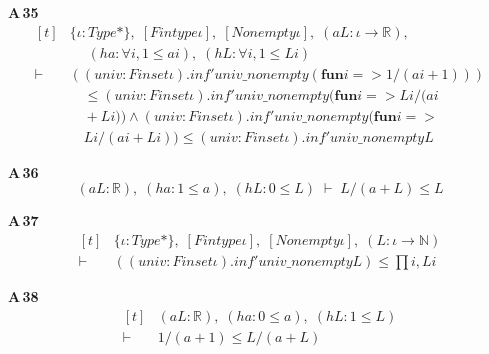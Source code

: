 \noindent\textbf{A\,35}\quad{}
{\footnotesize\[ \begin{aligned}[t]
&\{ \iota : \mathit{Type}*\},\; [\mathit{Fintype} \iota ],\; [\mathit{Nonempty} \iota ],\; (\mathit{a} \mathit{L} : \iota \to \mathbb{R} ),\\
&\quad \; (\mathit{ha} : \forall \mathit{i}, 1 \leq \mathit{a} \mathit{i}),\; (\mathit{hL} : \forall \mathit{i}, 1 \leq \mathit{L} \mathit{i})\\
\vdash\;&((\mathit{univ} : \mathit{Finset} \iota ).\mathit{inf'} \mathit{univ\_nonempty} (\mathbf{fun} \mathit{i} => 1/(\mathit{a} \mathit{i} + 1)))\\
&\quad \leq (\mathit{univ} : \mathit{Finset} \iota ).\mathit{inf'} \mathit{univ\_nonempty} (\mathbf{fun} \mathit{i} => \mathit{L} \mathit{i}/(\mathit{a} \mathit{i}\\
&\quad + \mathit{L} \mathit{i})) \wedge (\mathit{univ} : \mathit{Finset} \iota ).\mathit{inf'} \mathit{univ\_nonempty} (\mathbf{fun} \mathit{i} =>\\
&\quad \mathit{L} \mathit{i}/(\mathit{a} \mathit{i} + \mathit{L} \mathit{i})) \leq (\mathit{univ} : \mathit{Finset} \iota ).\mathit{inf'} \mathit{univ\_nonempty} \mathit{L}
\end{aligned} \]}

\noindent\textbf{A\,36}\quad{}
{\footnotesize\[ (\mathit{a} \mathit{L} : \mathbb{R} ),\; (\mathit{ha} : 1 \leq \mathit{a}),\; (\mathit{hL} : 0 \leq \mathit{L}) \;\vdash\; \mathit{L}/(\mathit{a} + \mathit{L}) \leq \mathit{L} \]}

\noindent\textbf{A\,37}\quad{}
{\footnotesize\[ \begin{aligned}[t]
&\{ \iota : \mathit{Type}*\},\; [\mathit{Fintype} \iota ],\; [\mathit{Nonempty} \iota ],\; (\mathit{L} : \iota \to \mathbb{N} )\\
\vdash\;&((\mathit{univ} : \mathit{Finset} \iota ).\mathit{inf'} \mathit{univ\_nonempty} \mathit{L}) \leq \textstyle\prod \mathit{i}, \mathit{L} \mathit{i}
\end{aligned} \]}

\noindent\textbf{A\,38}\quad{}
{\footnotesize\[ \begin{aligned}[t]
&(\mathit{a} \mathit{L} : \mathbb{R} ),\; (\mathit{ha} : 0 \leq \mathit{a}),\; (\mathit{hL} : 1 \leq \mathit{L})\\
\vdash\;&1/(\mathit{a} + 1) \leq \mathit{L}/(\mathit{a} + \mathit{L})
\end{aligned} \]}

